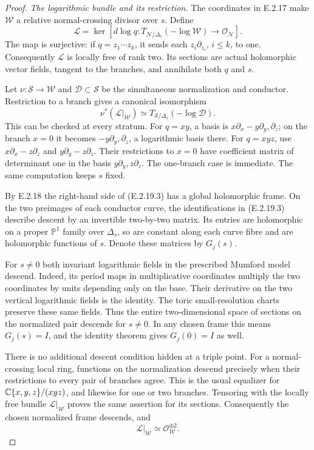 \begin{proof}
\emph{The logarithmic bundle and its restriction.}
The coordinates in E.2.17 make $\mathcal W$ a
relative normal-crossing divisor over $s$.
Define
\[
 \mathcal L=
 \ker\left[
 d\log q:
 T_{\mathcal N/\Delta_s}(-\log\mathcal W)
       \longrightarrow\mathcal O_{\mathcal N}
 \right].
 \tag{E.2.19.2}
\]
The map is surjective: if
$q=z_1\cdots z_k$, it sends each
$z_i\partial_{z_i}$, $i\leq k$, to one.
Consequently $\mathcal L$ is locally free of
rank two.  Its sections are actual holomorphic
vector fields, tangent to the branches, and
annihilate both $q$ and $s$.

Let $\nu:\mathcal S\to\mathcal W$ and
$\mathcal D\subset\mathcal S$ be the
simultaneous normalization and conductor.
Restriction to a branch gives a canonical
isomorphism
\[
 \nu^*(\mathcal L|_{\mathcal W})
 \simeq T_{\mathcal S/\Delta_s}(-\log\mathcal D).
 \tag{E.2.19.3}
\]
This can be checked at every stratum.  For
$q=xy$, a basis is
$x\partial_x-y\partial_y,\partial_z$;
on the branch $x=0$ it becomes
$-y\partial_y,\partial_z$, a logarithmic
basis there.  For $q=xyz$, use
$x\partial_x-z\partial_z$ and
$y\partial_y-z\partial_z$.  Their
restrictions to $x=0$ have coefficient
matrix of determinant one in the basis
$y\partial_y,z\partial_z$.
The one-branch case is immediate.
The same computation keeps $s$ fixed.

By E.2.18 the right-hand side of
(E.2.19.3) has a global holomorphic
frame.  On the two preimages of each
conductor curve, the identifications
in (E.2.19.3) describe descent by an
invertible two-by-two matrix.  Its
entries are holomorphic on a proper
$\mathbb P^1$ family over $\Delta_s$,
so are constant along each curve
fibre and are holomorphic functions
of $s$.  Denote these matrices by
$G_j(s)$.

For $s\ne0$ both invariant logarithmic
fields in the prescribed Mumford model
descend.  Indeed, its period maps in
multiplicative coordinates multiply
the two coordinates by units depending
only on the base.  Their derivative
on the two vertical logarithmic
fields is the identity.  The toric
small-resolution charts preserve
these same fields.  Thus the entire
two-dimensional space of sections
on the normalized pair descends for
$s\ne0$.  In any chosen frame this
means $G_j(s)=I$, and the identity
theorem gives $G_j(0)=I$ as well.

There is no additional descent
condition hidden at a triple point.
For a normal-crossing local ring,
functions on the normalization
descend precisely when their
restrictions to every pair of
branches agree.  This is the usual
equalizer for
$\mathbb C\{x,y,z\}/(xyz)$, and likewise
for one or two branches.  Tensoring
with the locally free bundle
$\mathcal L|_{\mathcal W}$ proves
the same assertion for its sections.
Consequently the chosen normalized
frame descends, and
\[
 \mathcal L|_{\mathcal W}
       \simeq\mathcal O_{\mathcal W}^{\oplus2}.
 \tag{E.2.19.4}
\]


\end{proof}
